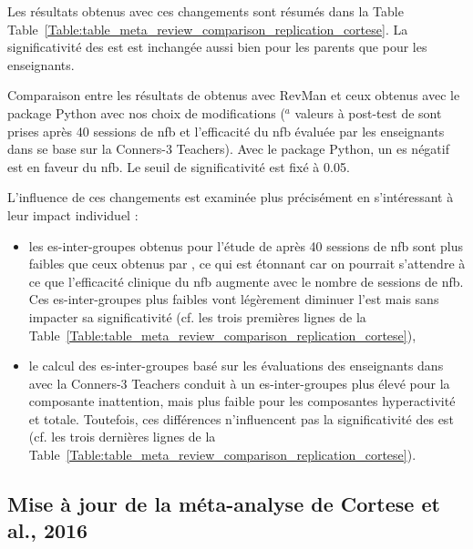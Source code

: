 Les résultats obtenus avec ces changements sont résumés dans la Table Table~\ref{Table:table_meta_review_comparison_replication_cortese}.
La significativité des \gls{est} est inchangée aussi bien pour les parents que pour les enseignants.

\begin{table}[h!]
  \centering
  \caption{Comparaison entre les résultats de \citet{Cortese2016} obtenus avec RevMan \citep{Revman} et ceux obtenus avec le package Python \citep{Bussalb2019clinical}
	avec nos choix de modifications ($^a$ valeurs à post-test de \citet{Arnold2014} sont prises après 40 sessions de \gls{nfb} et l'efficacité du \gls{nfb} évaluée 
	par les enseignants dans \citet{Steiner2014} se base sur la Conners-3 Teachers).
	Avec le package Python, un \gls{es} négatif est en faveur du \gls{nfb}. Le seuil de significativité est fixé à 0.05.}
  
  \label{Table:table_meta_review_comparison_replication_cortese}
\end{table}

L'influence de ces changements est examinée plus précisément en s'intéressant à leur impact individuel :
\begin{itemize}
\item les \gls{es}-inter-groupes obtenus pour l'étude de \citet{Arnold2014} après 40 sessions de \gls{nfb} sont plus faibles que ceux obtenus 
par \citet{Cortese2016}, ce qui est étonnant car on pourrait s'attendre à ce que l'efficacité clinique du \gls{nfb} augmente avec le nombre de
sessions de \gls{nfb}. Ces \gls{es}-inter-groupes plus faibles vont légèrement diminuer l'\gls{est} mais sans impacter sa significativité 
(cf. les trois premières lignes de la Table~\ref{Table:table_meta_review_comparison_replication_cortese}),
\item le calcul des \gls{es}-inter-groupes basé sur les évaluations des enseignants dans \citet{Steiner2014} avec la Conners-3 Teachers
conduit à un \gls{es}-inter-groupes plus élevé pour la composante inattention, mais plus faible pour les composantes hyperactivité et totale. Toutefois, ces
différences n'influencent pas la significativité des \gls{est} (cf. les trois dernières lignes de la 
Table~\ref{Table:table_meta_review_comparison_replication_cortese}). 
\end{itemize}

\subsection{Mise à jour de la méta-analyse de Cortese et al., 2016} \label{selection_studies}

